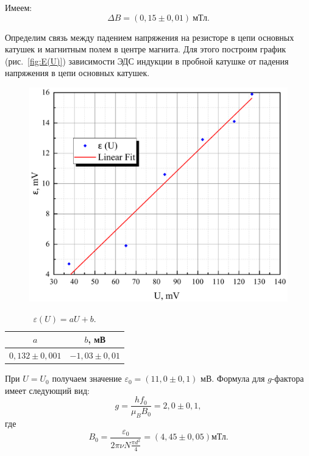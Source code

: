 \documentclass[a4paper,12pt]{article} %
\begin{document}
		Имеем:
		\[\boxed{\Delta B = (0,15 \pm 0,01) \ \text{мТл}}.\]
		
		Определим связь между падением напряжения на резисторе в цепи основных катушек и магнитным полем в центре магнита. Для этого построим график (рис.~\ref{fig:E(U)}) зависимости ЭДС индукции в пробной катушке от падения напряжения в цепи основных катушек.
		
		\begin{figure}[h!]
			\begin{floatrow}
				{\includegraphics[scale=0.5]{graph.pdf}}    
			\end{floatrow}
		\end{figure}
		\begin{table}[H]
			\caption{$\varepsilon (U) = aU + b$.}
			\label{tab:P}
			\begin{tabular}{|c|c|}
				\hline
				$a$ & $b$, мВ \\ \hline
				$0,132 \pm 0,001 $   & $-1,03 \pm 0,01$       \\ \hline
			\end{tabular}
		\end{table}
		
		При $U=U_0$ получаем значение $\varepsilon_0 = (11,0 \pm 0,1)$ мВ. Формула для $g$-фактора имеет следующий вид:
		\begin{equation*}
			g = \frac{hf_0}{\mu_BB_0} = 2,0 \pm 0,1,
		\end{equation*}
		где
		\begin{equation*}
			B_0 = \frac{\varepsilon_0}{2\pi\nu N \frac{\pi d^2}{4}} = (4,45 \pm 0,05) \text{мТл}.
		\end{equation*}
		
\end{document}
